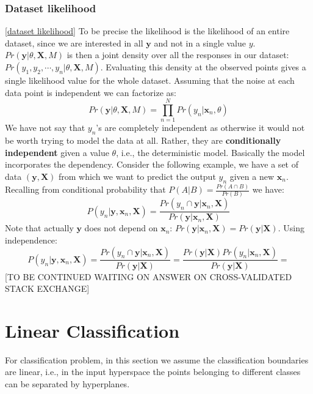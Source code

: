 \documentclass[12pt, letterpaper]{article}
\theoremstyle{definition}
\newcommand{\X}{\mathrm{\mathbf{X}}}
\newcommand{\y}{\mathbf{y}}
\newcommand{\x}{\mathbf{x}}
\begin{document}
\subsubsection{Dataset likelihood}
\label{dataset likelihood}
\autoref{dataset likelihood}
To be precise the likelihood is the likelihood of an entire dataset, since we are interested in all $\y$ and not in a single value $y$. $Pr(\y|\theta,\X,M)$ is then a joint density over all the responses in our dataset: $Pr(y_1, y_2, \cdots, y_n|\theta,\X,M)$. Evaluating this density at the observed points gives a single likelihood value for the whole dataset.	 Assuming that the noise at each data point is independent we can factorize as:
\begin{equation}
Pr(\y|\theta,\X,M) = \prod_{n=1}^N Pr(y_n|\x_n, \theta)
\end{equation}
We have not say that $y_n$'s are completely independent as otherwise it would not be worth trying to model the data at all. Rather, they are \textbf{conditionally independent} given a value $\theta$, i.e., the deterministic model.
Basically the model incorporates the dependency. Consider the following example, we have a set of data $(\y,\X)$ from which we want to predict the output $y_n$ given a new $\x_n$. Recalling from conditional probability that $P(A|B) = \frac{Pr(A\cap B)}{Pr(B)}$ we have:
\begin{equation}
P(y_n|\y,\x_n, \X) = \frac{Pr(y_n\cap \y|\x_n,\X)}{Pr(\y|\x_n,\X)}
\end{equation}
Note that actually $\y$ does not depend on $\x_n$: $Pr(\y|\x_n,\X) = Pr(\y|\X)$. Using independence:
\begin{equation}
P(y_n|\y,\x_n, \X) = \frac{Pr(y_n\cap \y|\x_n,\X)}{Pr(\y|\X)} = \frac{Pr(\y|\X) Pr(y_n|\x_n,\X)}{Pr(\y|\X)} = 
\end{equation}
[TO BE CONTINUED WAITING ON ANSWER ON CROSS-VALIDATED STACK EXCHANGE]

\newpage
\section{Linear Classification}
For classification problem, in this section we assume the classification boundaries are linear, i.e., in the input hyperspace the points belonging to different classes can be separated by hyperplanes. 
\end{document}
